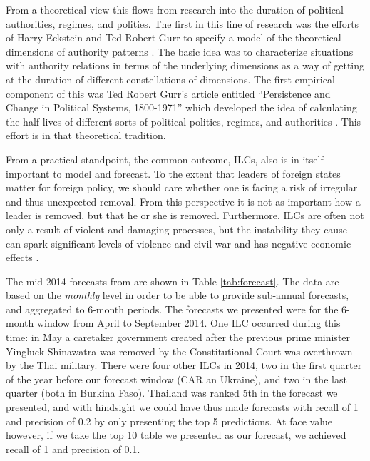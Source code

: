 \documentclass[pdftex,11pt]{article}
\begin{document}
From a theoretical view this flows from research into the duration of political authorities, regimes, and polities.  The first in this line of research was the efforts of
Harry Eckstein and Ted Robert Gurr to specify a model of the theoretical dimensions of authority patterns \citep{eckstein:1973,eckstein:gurr:1975}.  The basic idea was to characterize situations with authority relations in terms of the underlying dimensions as a way of getting at the duration of different constellations of dimensions.  The first empirical component of this was Ted Robert Gurr's article entitled ``Persistence and Change in Political Systems, 1800-1971'' which developed the idea of calculating the half-lives of different sorts of political polities, regimes, and authorities \citep{gurr:1974}. This effort is in that theoretical tradition.

From a practical standpoint, the common outcome, ILCs, also is in itself important to model and forecast. To the extent that leaders of foreign states matter for foreign policy, we should care whether one is facing a risk of irregular and thus unexpected removal. From this perspective it is not as important how a leader is removed, but that he or she is removed. Furthermore, ILCs are often not only a result of violent and damaging processes, but the instability they cause can spark significant levels of violence and civil war \citep[256]{powell:thyne:2011} and has negative economic effects \citep{alesina:etal:1996, ulfelder:2013}.

The mid-2014 forecasts from \citet{beger:dorff:ward:2014a} are shown in Table \ref{tab:forecast}. The data are based on the \textit{monthly} level in order to be able to provide sub-annual forecasts, and aggregated to 6-month periods. The forecasts we presented were for the 6-month window from April to September 2014. One ILC occurred during this time: in May a caretaker government created after the previous prime minister Yingluck Shinawatra was removed by the Constitutional Court was overthrown by the Thai military. There were four other ILCs in 2014, two in the first quarter of the year before our forecast window (CAR an Ukraine), and two in the last quarter (both in Burkina Faso). Thailand was ranked 5th in the forecast we presented, and with hindsight we could have thus made forecasts with recall of 1 and precision of 0.2 by only presenting the top 5 predictions. At face value however, if we take the top 10 table we presented as our forecast, we achieved recall of 1 and precision of 0.1. 
\end{document}
